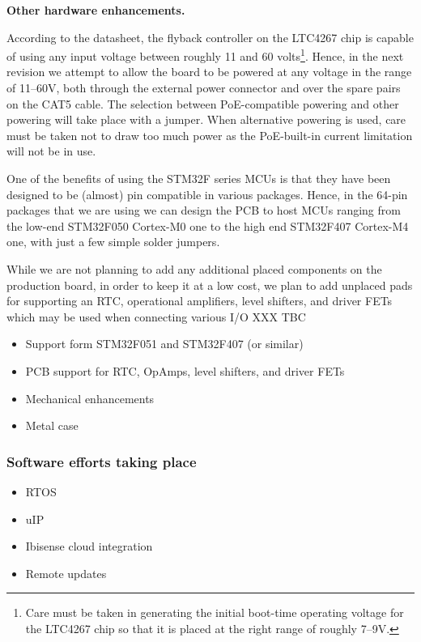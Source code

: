 \documentclass[draft,a4paper]{siamltex}
\begin{document}
{\bf Other hardware enhancements.}

According to the datasheet, the flyback controller on the LTC4267 chip
is capable of using any input voltage between roughly 11 and 60
volts\footnote{Care must be taken in generating the initial
boot-time operating voltage for the LTC4267 chip so that it is placed
at the right range of roughly 7--9V.}.  Hence, in the next revision we
attempt to allow the board to be powered at any voltage in the range
of 11--60V, both through the external power connector and over the
spare pairs on the CAT5 cable.  The selection between PoE-compatible
powering and other powering will take place with a jumper.  When
alternative powering is used, care must be taken not to draw too much
power as the PoE-built-in current limitation will not be in use.

One of the benefits of using the STM32F series MCUs is that they have
been designed to be (almost) pin compatible in various packages.
Hence, in the 64-pin packages that we are using we can design the PCB
to host MCUs ranging from the low-end STM32F050 Cortex-M0 one to the
high end STM32F407 Cortex-M4 one, with just a few simple solder
jumpers.

While we are not planning to add any additional placed components on
the production board, in order to keep it at a low cost, we plan to
add unplaced pads for supporting an RTC, operational amplifiers, level
shifters, and driver FETs which may be used when connecting various
I/O XXX TBC


\begin{itemize}
\item Support form STM32F051 and STM32F407 (or similar)
\item PCB support for RTC, OpAmps, level shifters, and driver FETs
\item Mechanical enhancements
\item Metal case
\end{itemize}

\subsubsection{Software efforts taking place}

\begin{itemize}
\item RTOS
\item uIP
\item Ibisense cloud integration
\item Remote updates
\end{itemize}
\end{document}
